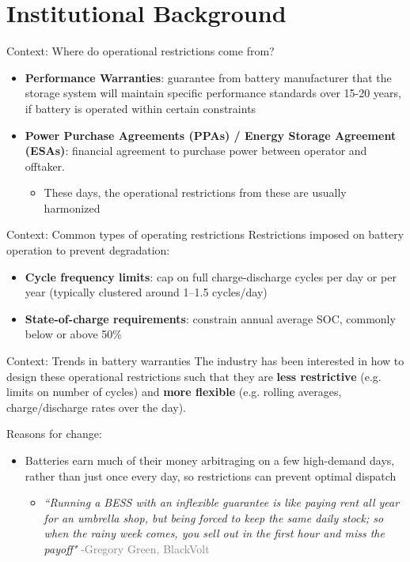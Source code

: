 \documentclass{beamer}
\begin{document}
\section{Institutional Background}

\begin{frame}{Context: Where do operational restrictions come from?}
\begin{itemize}
    \item \textbf{Performance Warranties}: guarantee from battery manufacturer that the storage system will maintain specific performance standards over 15-20 years, if battery is operated within certain constraints
    \item \textbf{Power Purchase Agreements (PPAs) / Energy Storage Agreement (ESAs)}: financial agreement to purchase power between operator and offtaker. 
    \begin{itemize}
        \item These days, the operational restrictions from these are usually harmonized 
    \end{itemize}
\end{itemize}
\end{frame}



\begin{frame}{Context: Common types of operating restrictions}
Restrictions imposed on battery operation to prevent degradation:
\begin{itemize}
    \item \textbf{Cycle frequency limits}: cap on full charge-discharge cycles per day or per year (typically clustered around 1--1.5 cycles/day)
    \item \textbf{State-of-charge requirements}: constrain annual average SOC, commonly below or above 50\%
\end{itemize}
\end{frame}

\begin{frame}{Context: Trends in battery warranties}
The industry has been interested in how to design these operational restrictions such that they are  \textbf{less restrictive}  (e.g. limits on number of cycles) and  \textbf{more flexible} (e.g. rolling averages, charge/discharge rates over the day).

\vspace{0.3cm}
Reasons for change:
\begin{itemize}
    \item Batteries earn much of their money arbitraging on a few high-demand days, rather than just once every day, so restrictions can prevent optimal dispatch
    \begin{itemize}
        \item \textit{``Running a BESS with an inflexible guarantee is like paying rent all year for an umbrella shop, but being forced to keep the same daily stock; so when the rainy week comes, you sell out in the first hour and miss the payoff"} \textcolor{gray}{-Gregory Green, BlackVolt}
    \end{itemize}
\end{itemize}
\end{frame}
\end{document}

